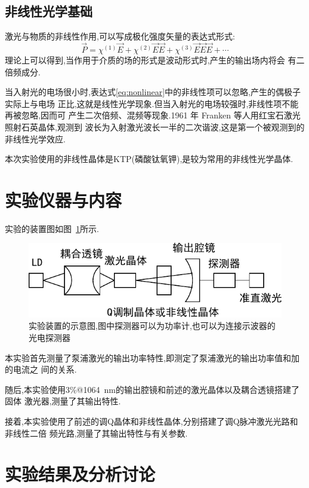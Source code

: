 \documentclass[aps,pre,12pt,preprint,onecolumn,showpacs,showkeys]{revtex4-1}
\begin{document}
\subsection{非线性光学基础}

激光与物质的非线性作用,可以写成极化强度矢量的表达式形式:
\begin{equation}
    \label{eq:nonlinear}
    \vec{P} = \chi^{(1)}\vec{E} + \chi^{(2)}\vec{E}\vec{E} +
    \chi^{(3)}\vec{E}\vec{E}\vec{E} + \cdots
\end{equation}
理论上可以得到\cite{Book},当作用于介质的场的形式是波动形式时,产生的输出场内将会
有二倍频成分.

当入射光的电场很小时,表达式\ref{eq:nonlinear}中的非线性项可以忽略,产生的偶极子实际上与电场
正比,这就是线性光学现象.但当入射光的电场较强时,非线性项不能再被忽略,因而可
产生二次倍频、混频等现象.1961 年 Franken 等人用红宝石激光照射石英晶体,观测到
波长为入射激光波长一半的二次谐波,这是第一个被观测到的非线性光学效应.\cite{Note}

本次实验使用的非线性晶体是KTP(磷酸钛氧钾),是较为常用的非线性光学晶体.

\section{实验仪器与内容}

实验的装置图如图~\ref{fig:graph}所示.

\begin{figure}[htbp]
    \includegraphics[width=.8\textwidth]{graph.pdf}
    \caption{\label{fig:graph}%
        实验装置的示意图,图中探测器可以为功率计,也可以为连接示波器的光电探测器}
\end{figure}

本实验首先测量了泵浦激光的输出功率特性,即测定了泵浦激光的输出功率值和加的电流之
间的关系.

随后,本实验使用3\%@\SI{1064}{nm}的输出腔镜和前述的激光晶体以及耦合透镜搭建了固体
激光器,测量了其输出特性.

接着,本实验使用了前述的调Q晶体和非线性晶体,分别搭建了调Q脉冲激光光路和非线性二倍
频光路,测量了其输出特性与有关参数.

\section{实验结果及分析讨论}
 
\end{document}
